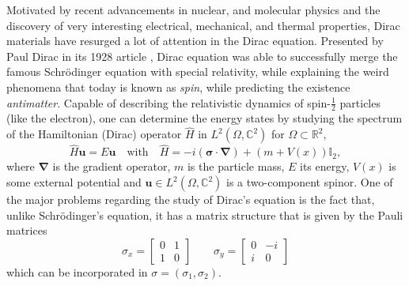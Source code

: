 Motivated by recent advancements in nuclear, and molecular physics and the discovery of very interesting electrical, mechanical, and thermal properties, Dirac materials have resurged a lot of attention in the Dirac equation. Presented by Paul Dirac in its 1928 article \cite{dirac1928quantum}, Dirac equation was able to successfully merge the famous Schr\"{o}dinger equation with special relativity, while explaining the weird phenomena that today is known as \textit{spin}, while predicting the existence \textit{antimatter}.
Capable of describing the relativistic dynamics of spin-$\frac{1}{2}$ particles (like the electron), one can determine the energy states by studying the spectrum of the Hamiltonian (Dirac) operator \(\hat{H}\) in \(L^2(\Omega, \mathbb{C}^2)\) for \(\Omega \subset \mathbb{R}^2\),
\begin{equation}\label{dirac_eq}
    \hat{H} \mathbf{u} = E \mathbf{u} \quad \text{with} \quad \hat{H}= -i (\mathbf{\sigma} \cdot \mathbf{\nabla}) + \left(m + V(x)\right) \mathbb{I}_2,
\end{equation}
where \(\mathbf{\nabla}\) is the gradient operator, \(m\) is the particle mass, \(E\) its energy, \(V(x)\) is some external potential and \(\mathbf{u} \in L^2(\Omega, \mathbb{C}^2)\) is a two-component spinor. One of the major problems regarding the study of Dirac's equation is the fact that, unlike Schr\"{o}dinger's equation, it has a matrix structure that is given by the Pauli matrices
\[
\sigma_x = \begin{bmatrix}
    0 & 1\\
    1 & 0
\end{bmatrix} \qquad \sigma_y = \begin{bmatrix}
    0 & -i\\
    i & 0
\end{bmatrix}
\]
which can be incorporated in \(\sigma = (\sigma_1, \sigma_2)\).    

